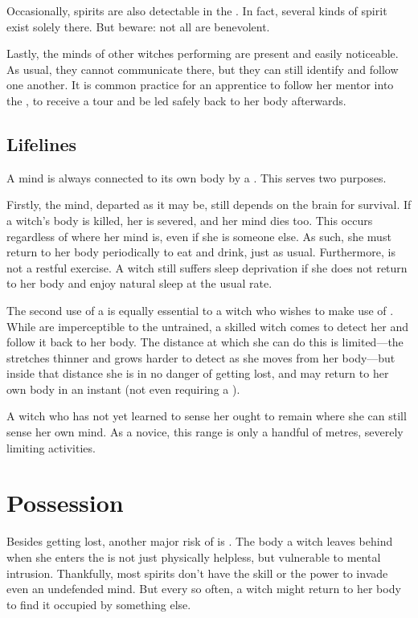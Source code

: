 Occasionally, spirits are also detectable in the {\mentalrealm}.
In fact, several kinds of spirit exist solely there.
But beware: not all are benevolent.

Lastly, the minds of other witches performing  are present and easily noticeable.
As usual, they cannot communicate there, but they can still identify and follow one another.
It is common practice for an apprentice to follow her mentor into the {\mentalrealm}, to receive a tour and be led safely back to her body afterwards.

\subsection{Lifelines}

A mind is always connected to its own body by a {\lifeline}.
This {\lifeline} serves two purposes.

Firstly, the mind, departed as it may be, still depends on the brain for survival.
If a witch's body is killed, her {\lifeline} is severed, and her mind dies too.
This occurs regardless of where her mind is, even if she is {\possessing} someone else.
As such, she must return to her body periodically to eat and drink, just as usual.
Furthermore,  is not a restful exercise.
A witch still suffers sleep deprivation if she does not return to her body and enjoy natural sleep at the usual rate.

The second use of a {\lifeline} is equally essential to a witch who wishes to make use of .
While {\lifelines} are imperceptible to the untrained, a skilled witch comes to detect her {\lifeline} and follow it back to her body.
The distance at which she can do this is limited---the {\lifeline} stretches thinner and grows harder to detect as she moves from her body---but inside that distance she is in no danger of getting lost, and may return to her own body in an instant (not even requiring a {\action}).

A witch who has not yet learned to sense her {\lifeline} ought to remain where she can still sense her own mind.
As a novice, this range is only a handful of metres, severely limiting activities.

\section{Possession}

Besides getting lost, another major risk of  is {\possession}.
The body a witch leaves behind when she enters the {\mentalrealm} is not just physically helpless, but vulnerable to mental intrusion.
Thankfully, most spirits don't have the skill or the power to invade even an undefended mind.
But every so often, a witch might return to her body to find it occupied by something else.

